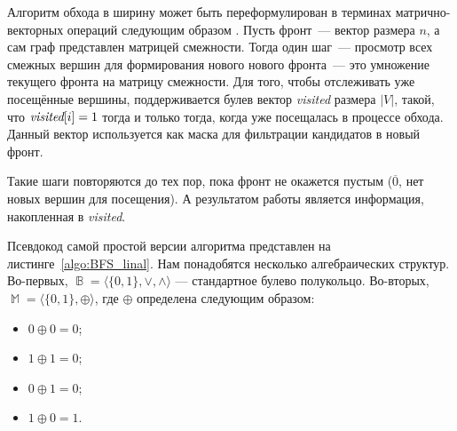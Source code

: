 Алгоритм обхода в ширину может быть переформулирован в терминах матрично-векторных операций следующим образом%
.
Пусть фронт~--- вектор размера $n$, а сам граф представлен матрицей смежности.
Тогда один шаг~--- просмотр всех смежных вершин для формирования нового нового фронта~--- это умножение текущего фронта на матрицу смежности.
Для того, чтобы отслеживать уже посещённые вершины, поддерживается булев вектор \emph{visited} размера $|V|$, такой, что $\emph{visited}[i] = 1$ тогда и только тогда, когда   уже посещалась в процессе обхода.
Данный вектор используется как маска для фильтрации кандидатов в новый фронт.

Такие шаги повторяются до тех пор, пока фронт не окажется пустым ($\overline{0}$, нет новых вершин для посещения).
А результатом работы является информация, накопленная в \emph{visited}.

Псевдокод самой простой версии алгоритма представлен на листинге~\ref{algo:BFS_linal}.
Нам понадобятся несколько алгебраических структур.
Во-первых, $\BbbB = \langle \{0,1\},\vee, \wedge \rangle$ --- стандартное булево полукольцо.
Во-вторых, $\BbbM = \langle \{0,1\},\oplus \rangle$, где $\oplus$ определена следующим образом:
\begin{minipage}{0.25\textwidth}
    \begin{itemize}
        \item $0 \oplus 0 = 0$;
        \item $1 \oplus 1 = 0$;
    \end{itemize}
\end{minipage}
\begin{minipage}{0.25\textwidth}
    \begin{itemize}
        \item $0 \oplus 1 = 0$;
        \item $1 \oplus 0 = 1$.
    \end{itemize}
\end{minipage}


